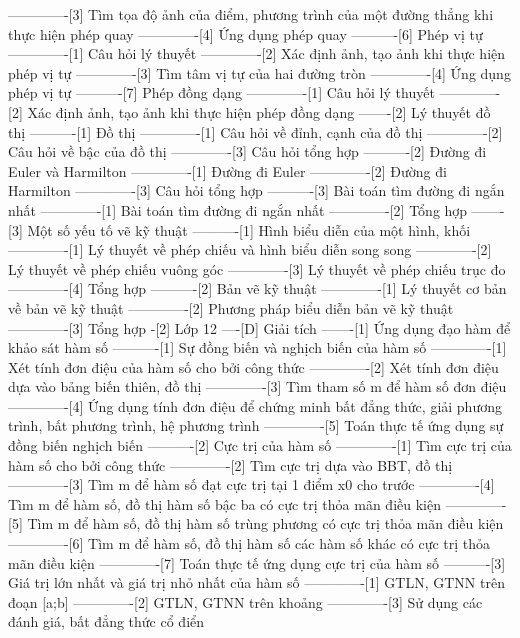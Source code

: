 -------------[3] Tìm tọa độ ảnh của điểm, phương trình của một đường thẳng khi thực hiện phép quay
-------------[4] Ứng dụng phép quay
----------[6] Phép vị tự
-------------[1] Câu hỏi lý thuyết
-------------[2] Xác định ảnh, tạo ảnh khi thực hiện phép vị tự
-------------[3] Tìm tâm vị tự của hai đường tròn
-------------[4] Ứng dụng phép vị tự
----------[7] Phép đồng dạng
-------------[1] Câu hỏi lý thuyết
-------------[2] Xác định ảnh, tạo ảnh khi thực hiện phép đồng dạng
-------[2] Lý thuyết đồ thị
----------[1] Đồ thị
-------------[1] Câu hỏi về đỉnh, cạnh của đồ thị
-------------[2] Câu hỏi về bậc của đồ thị
-------------[3] Câu hỏi tổng hợp
----------[2] Đường đi Euler và Harmilton
-------------[1] Đường đi Euler
-------------[2] Đường đi Harmilton
-------------[3] Câu hỏi tổng hợp
----------[3] Bài toán tìm đường đi ngắn nhất
-------------[1] Bài toán tìm đường đi ngắn nhất
-------------[2] Tổng hợp
-------[3] Một số yếu tố vẽ kỹ thuật
----------[1] Hình biểu diễn của một hình, khối
-------------[1] Lý thuyết về phép chiếu và hình biểu diễn song song
-------------[2] Lý thuyết về phép chiếu vuông góc
-------------[3] Lý thuyết về phép chiếu trục đo
-------------[4] Tổng hợp
----------[2] Bản vẽ kỹ thuật
-------------[1] Lý thuyết cơ bản về bản vẽ kỹ thuật
-------------[2] Phương pháp biểu diễn bản vẽ kỹ thuật
-------------[3] Tổng hợp
-[2] Lớp 12
----[D] Giải tích
-------[1] Ứng dụng đạo hàm để khảo sát hàm số
----------[1] Sự đồng biến và nghịch biến của hàm số
-------------[1] Xét tính đơn điệu của hàm số cho bởi công thức
-------------[2] Xét tính đơn điệu dựa vào bảng biến thiên, đồ thị
-------------[3] Tìm tham số m để hàm số đơn điệu
-------------[4] Ứng dụng tính đơn điệu để chứng minh bất đẳng thức, giải phương trình, bất phương trình, hệ phương trình
-------------[5] Toán thực tế ứng dụng sự đồng biến nghịch biến
----------[2] Cực trị của hàm số
-------------[1] Tìm cực trị của hàm số cho bởi công thức
-------------[2] Tìm cực trị dựa vào BBT, đồ thị
-------------[3] Tìm m để hàm số đạt cực trị tại 1 điểm x0 cho trước
-------------[4] Tìm m để hàm số, đồ thị hàm số bậc ba có cực trị thỏa mãn điều kiện
-------------[5] Tìm m để hàm số, đồ thị hàm số trùng phương có cực trị thỏa mãn điều kiện
-------------[6] Tìm m để hàm số, đồ thị hàm số các hàm số khác có cực trị thỏa mãn điều kiện
-------------[7] Toán thực tế ứng dụng cực trị của hàm số
----------[3] Giá trị lớn nhất và giá trị nhỏ nhất của hàm số
-------------[1] GTLN, GTNN trên đoạn [a;b]
-------------[2] GTLN, GTNN trên khoảng
-------------[3] Sử dụng các đánh giá, bất đẳng thức cổ điển
